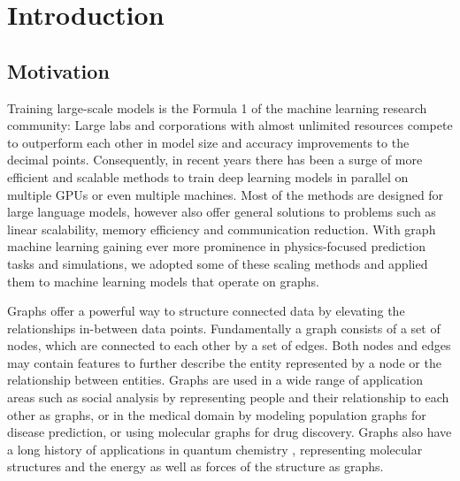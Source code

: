 \section{Introduction}

\subsection{Motivation}

Training large-scale models is the Formula 1 of the machine learning research community: Large labs and corporations with 
almost unlimited resources compete to outperform each other in model size and accuracy improvements to the decimal points. 
Consequently, in recent years there has been a surge of more efficient and scalable methods to train deep learning models 
in parallel on multiple GPUs or even multiple machines. Most of the methods are designed for large language models, however 
also offer general solutions to problems such as linear scalability, memory efficiency and 
communication reduction. With graph machine learning gaining ever more prominence in physics-focused prediction tasks and 
simulations, we adopted some of these scaling methods and applied them to machine learning models that operate on graphs. 

Graphs offer a powerful way to structure connected data by elevating the relationships in-between data points. 
Fundamentally a graph consists of a set of nodes, which are connected to each other by a set of edges. Both nodes 
and edges may contain features to further describe the entity represented by a node or the relationship between entities.
Graphs are used in a wide range of application areas such as social analysis by representing people and their relationship 
to each other as graphs, or in the medical domain by modeling population graphs for disease prediction, or using molecular graphs 
for drug discovery. Graphs also have a long history of applications in quantum chemistry
\cite*{10.48550/ARXIV.1704.01212}, representing molecular 
structures and the energy as well as forces of the structure as graphs. 

